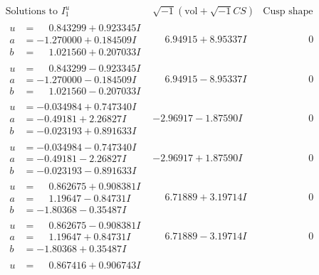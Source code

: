 \documentclass[1p]{elsarticle_modified}
\theoremstyle{definition}
\newcommand{\I}{\sqrt{-1}}
\begin{document}
$$\begin{array}{c|c|c}
\text{Solutions to }I^u_{1}& \I (\text{vol} + \sqrt{-1}CS) & \text{Cusp shape}\\
 \hline 
\begin{aligned}
u &= \phantom{-}0.843299 + 0.923345 I \\
a &= -1.270000 + 0.184509 I \\
b &= \phantom{-}1.021560 + 0.207033 I\end{aligned}
 & \phantom{-}6.94915 + 8.95337 I & \phantom{-0.000000 } 0 \\ \hline\begin{aligned}
u &= \phantom{-}0.843299 - 0.923345 I \\
a &= -1.270000 - 0.184509 I \\
b &= \phantom{-}1.021560 - 0.207033 I\end{aligned}
 & \phantom{-}6.94915 - 8.95337 I & \phantom{-0.000000 } 0 \\ \hline\begin{aligned}
u &= -0.034984 + 0.747340 I \\
a &= -0.49181 + 2.26827 I \\
b &= -0.023193 + 0.891633 I\end{aligned}
 & -2.96917 - 1.87590 I & \phantom{-0.000000 } 0 \\ \hline\begin{aligned}
u &= -0.034984 - 0.747340 I \\
a &= -0.49181 - 2.26827 I \\
b &= -0.023193 - 0.891633 I\end{aligned}
 & -2.96917 + 1.87590 I & \phantom{-0.000000 } 0 \\ \hline\begin{aligned}
u &= \phantom{-}0.862675 + 0.908381 I \\
a &= \phantom{-}1.19647 - 0.84731 I \\
b &= -1.80368 - 0.35487 I\end{aligned}
 & \phantom{-}6.71889 + 3.19714 I & \phantom{-0.000000 } 0 \\ \hline\begin{aligned}
u &= \phantom{-}0.862675 - 0.908381 I \\
a &= \phantom{-}1.19647 + 0.84731 I \\
b &= -1.80368 + 0.35487 I\end{aligned}
 & \phantom{-}6.71889 - 3.19714 I & \phantom{-0.000000 } 0 \\ \hline\begin{aligned}
u &= \phantom{-}0.867416 + 0.906743 I \\

\end{aligned}
\end{array}$$
\end{document}
